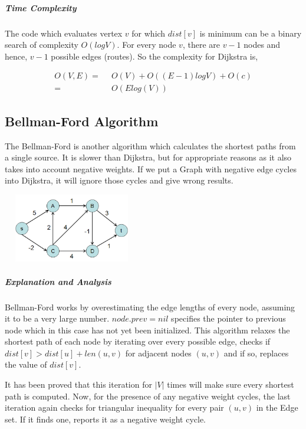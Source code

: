 \documentclass[11pt,a4paper]{extarticle}
\begin{document}
\subparagraph{Time Complexity}
The code which evaluates vertex $v$ for which $dist[v]$ is minimum can be a binary search of complexity $O(logV)$. For every node $v$, there are $v-1$ nodes and hence, $v-1$ possible edges (routes). So the complexity for Dijkstra is,

\begin{align}
O(V,E) =& \,\,\,O(V) + O((E-1)logV) + O(c)\\
	   =& \,\,\,O(Elog(V))
\end{align}

\subsection{Bellman-Ford Algorithm}
The Bellman-Ford is another algorithm which calculates the shortest paths from a single source. It is slower than Dijkstra, but for appropriate reasons as it also takes into account negative weights. If we put a Graph with negative edge cycles into Dijkstra, it will ignore those cycles and give wrong results.

\begin{center}
	\includegraphics[width=6cm, height=3cm]{bellford}
\end{center}

\begin{adjustwidth}{2.5em}{0pt}

\end{adjustwidth}

\subparagraph{Explanation and Analysis}
Bellman-Ford works by overestimating the edge lengths of every node, assuming it to be a very large number. $node.prev = nil$ specifies the pointer to previous node which in this case has not yet been initialized. This algorithm relaxes the shortest path of each node by iterating over every possible edge, checks if $dist[v] > dist[u] + len(u,v)$ for adjacent nodes $(u,v)$ and if so, replaces the value of $dist[v]$. 

It has been proved that this iteration for $|V|$ times will make sure every shortest path is computed. Now, for the presence of any negative weight cycles, the last iteration again checks for triangular inequality for every pair $(u,v)$ in the Edge set. If it finds one, reports it as a negative weight cycle. 
\end{document}
